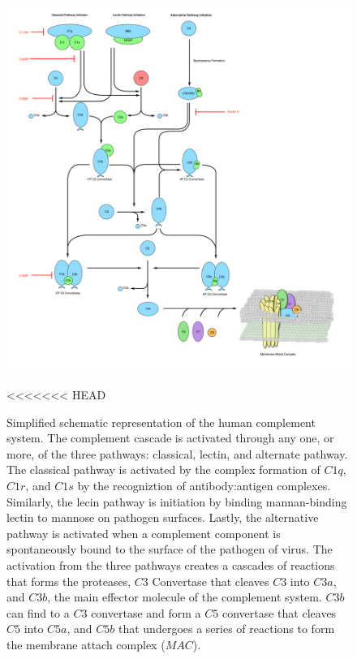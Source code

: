 \documentclass[12pt]{article}
\begin{document}
\begin{figure}[h]
\centering
\includegraphics[width=1.0\textwidth]{./Figures/ComplementSystemSchematic_v2.pdf}
\caption{Simplified schematic representation of the human complement system. The complement cascade is activated through any one, or more, of the three pathways: classical, lectin, and alternate pathway. The classical pathway is activated by the complex formation of $C1q$, $C1r$, and $C1s$ by the recogniztion of antibody:antigen complexes. Similarly, the lecin pathway is initiation by binding mannan-binding lectin to mannose on pathogen surfaces. Lastly, the alternative pathway is activated when a complement component is spontaneously bound to the surface of the pathogen of virus. The activation from the three pathways creates a cascades of reactions that forms the proteases, $C3$ Convertase that cleaves $C3$ into $C3a$, and $C3b$, the main effector molecule of the complement system. $C3b$ can find to a $C3$ convertase and form a $C5$ convertase that cleaves $C5$ into $C5a$, and $C5b$ that undergoes a series of reactions to form the membrane attach complex ($MAC$).}
<<<<<<< HEAD
\label{fig-schematic}
\end{figure}
\end{document}
